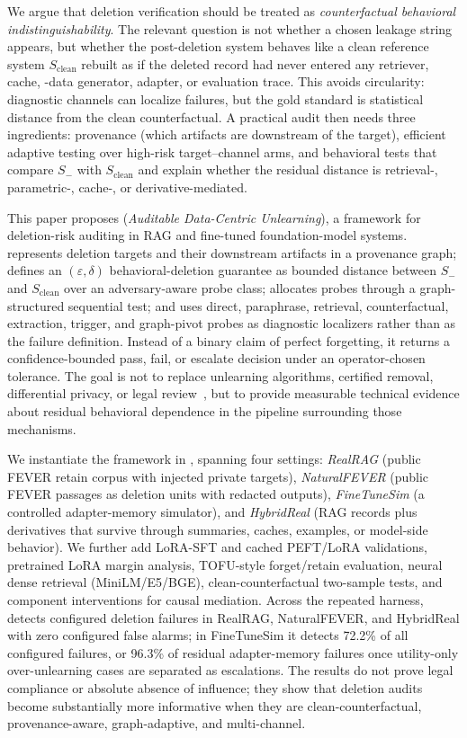 We argue that deletion verification should be treated as \emph{counterfactual behavioral indistinguishability}. The relevant question is not whether a chosen leakage string appears, but whether the post-deletion system behaves like a clean reference system $S_{\mathrm{clean}}$ rebuilt as if the deleted record had never entered any retriever, cache, -data generator, adapter, or evaluation trace. This avoids circularity: diagnostic channels can localize failures, but the gold standard is statistical distance from the clean counterfactual. A practical audit then needs three ingredients: provenance (which artifacts are downstream of the target), efficient adaptive testing over high-risk target--channel arms, and behavioral tests that compare $S_-$ with $S_{\mathrm{clean}}$ and explain whether the residual distance is retrieval-, parametric-, cache-, or derivative-mediated.

This paper proposes \method{} (\emph{Auditable Data-Centric Unlearning}), a framework for deletion-risk auditing in RAG and fine-tuned foundation-model systems. \method{} represents deletion targets and their downstream artifacts in a provenance graph; defines an $(\varepsilon,\delta)$ behavioral-deletion guarantee as bounded distance between $S_-$ and $S_{\mathrm{clean}}$ over an adversary-aware probe class; allocates probes through a graph-structured sequential test; and uses direct, paraphrase, retrieval, counterfactual, extraction, trigger, and graph-pivot probes as diagnostic localizers rather than as the failure definition. Instead of a binary claim of perfect forgetting, it returns a confidence-bounded pass, fail, or escalate decision under an operator-chosen tolerance. The goal is not to replace unlearning algorithms, certified removal, differential privacy, or legal review~\cite{dwork2006dp,guo2020certified,kirchenbauer2023watermark}, but to provide measurable technical evidence about residual behavioral dependence in the pipeline surrounding those mechanisms.

We instantiate the framework in \bench{}, spanning four settings: \emph{RealRAG} (public FEVER retain corpus with injected private targets), \emph{NaturalFEVER} (public FEVER passages as deletion units with redacted outputs), \emph{FineTuneSim} (a controlled adapter-memory simulator), and \emph{HybridReal} (RAG records plus derivatives that survive through summaries, caches, examples, or model-side behavior). We further add LoRA-SFT and cached PEFT/LoRA validations, pretrained LoRA margin analysis, TOFU-style forget/retain evaluation, neural dense retrieval (MiniLM/E5/BGE), clean-counterfactual two-sample tests, and component interventions for causal mediation. Across the repeated harness, \method{} detects configured deletion failures in RealRAG, NaturalFEVER, and HybridReal with zero configured false alarms; in FineTuneSim it detects 72.2\% of all configured failures, or 96.3\% of residual adapter-memory failures once utility-only over-unlearning cases are separated as escalations. The results do not prove legal compliance or absolute absence of influence; they show that deletion audits become substantially more informative when they are clean-counterfactual, provenance-aware, graph-adaptive, and multi-channel.

